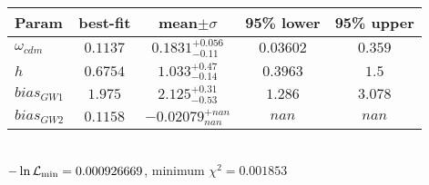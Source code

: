\begin{tabular}{|l|c|c|c|c|} 
 \hline 
Param & best-fit & mean$\pm\sigma$ & 95\% lower & 95\% upper \\ \hline 
$\omega_{cdm }$ &$0.1137$ & $0.1831_{-0.11}^{+0.056}$ & $0.03602$ & $0.359$ \\ 
$h$ &$0.6754$ & $1.033_{-0.14}^{+0.47}$ & $0.3963$ & $1.5$ \\ 
$bias_{GW 1 }$ &$1.975$ & $2.125_{-0.53}^{+0.31}$ & $1.286$ & $3.078$ \\ 
$bias_{GW 2 }$ &$0.1158$ & $-0.02079_{nan}^{+nan}$ & $nan$ & $nan$ \\ 
\hline 
 \end{tabular} \\ 
$-\ln{\cal L}_\mathrm{min} =0.000926669$, minimum $\chi^2=0.001853$ \\ 
